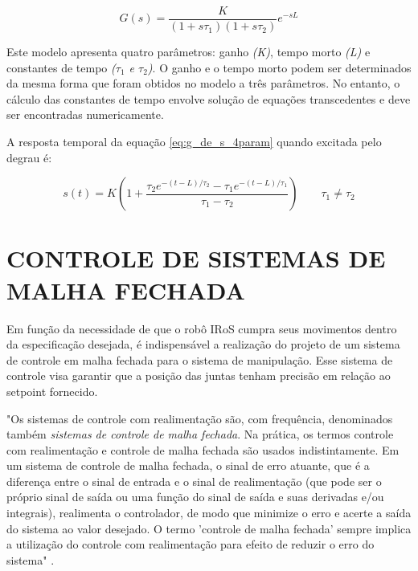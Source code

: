 \documentclass[12pt,oneside,a4paper, chapter=TITLE, section = TITLE, english, brazil]{abntex2}
\begin{document}
\begin{equation}
G(s) = \frac{K}{(1 + s\tau_{1})(1 + s\tau_{2})}e^{-sL} \label{eq:g_de_s_4param}
\end{equation}

Este modelo apresenta quatro parâmetros: ganho \textit{(K)}, tempo morto \textit{(L)} e constantes de tempo \textit{($\tau_{1}$ e $\tau_{2}$)}. O ganho e o tempo morto podem ser determinados da mesma forma que foram obtidos no modelo a três parâmetros. No entanto, o cálculo das constantes de tempo envolve solução de equações transcedentes e deve ser encontradas numericamente.

A resposta temporal da equação \ref{eq:g_de_s_4param} quando excitada pelo degrau é:

\begin{equation}
s(t) = K(1 + \frac{\tau_{2}e^{-(t-L)/\tau_{2}} - \tau_{1}e^{-(t-L)/\tau_{1}}}{\tau_{1} - \tau_{2}})
\qquad \tau_{1} \neq \tau_{2} \label{eq:g_de_t_4param}
\end{equation}


\chapter{CONTROLE DE SISTEMAS DE MALHA FECHADA}

Em função da necessidade de que o robô IRoS cumpra seus movimentos dentro da especificação desejada, é indispensável a realização do projeto de um sistema de  controle em malha fechada para o sistema de manipulação. Esse sistema de controle visa garantir que a posição das juntas tenham precisão em relação ao setpoint fornecido.

\begin{citacao}
"Os sistemas de controle com realimentação são, com frequência, denominados também \textit{sistemas de controle de malha fechada}. Na prática, os termos controle com realimentação e controle de malha fechada são usados indistintamente. Em um sistema de controle de malha fechada, o sinal de erro atuante, que é a diferença entre o sinal de entrada e o sinal de realimentação (que pode ser o próprio sinal de saída ou uma função do sinal de saída e suas derivadas e/ou integrais), realimenta o controlador, de modo que minimize o erro e acerte a saída do sistema ao valor desejado. O termo 'controle de malha fechada' sempre implica a utilização do controle com realimentação para efeito de reduzir o erro do sistema" \cite{ogata}.
\end{citacao}
\end{document}
